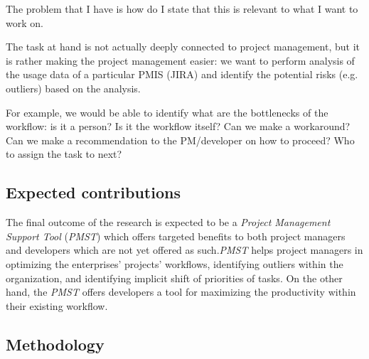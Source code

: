 \documentclass[a4paper, 12pt]{article}
\begin{document}
The problem that I have is how do I state that this is relevant to what I want to work on.

The task at hand is not actually deeply connected to project management, but it is rather making the project management easier:
we want to perform analysis of the usage data of a particular PMIS (JIRA) and identify the potential risks (e.g. outliers) based on the analysis.

For example, we would be able to identify what are the bottlenecks of the workflow: is it a person? Is it the workflow itself?
Can we make a workaround? Can we make a recommendation to the PM/developer on how to proceed? Who to assign the task to next?



\subsection{Expected contributions}


The final outcome of the research is expected to be a \textit{Project Management Support Tool} (\textit{PMST}) which offers targeted benefits to both project managers and developers which are not yet offered as such.\textit{PMST} helps project managers in optimizing the enterprises' projects' workflows, identifying outliers within the organization, and identifying implicit shift of priorities of tasks. On the other hand, the \textit{PMST} offers developers a tool for maximizing the productivity within their existing workflow.

\subsection{Methodology}

\end{document}
